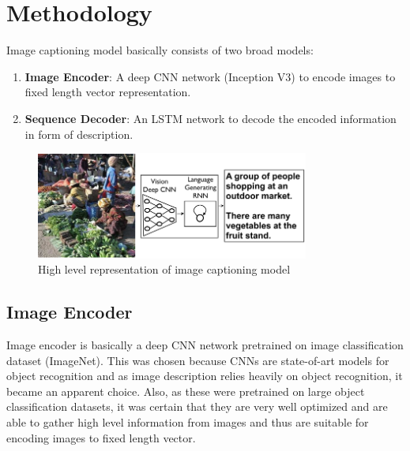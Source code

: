 \documentclass[11pt]{article}
\begin{document}
	\section{Methodology}
		Image captioning model basically consists of two broad models:
		\begin{enumerate}
		\item
			\textbf{Image Encoder}: A deep CNN network (Inception V3) to encode images to fixed length vector representation.
		\item
			\textbf{Sequence Decoder}: An LSTM network to decode the encoded information in form of description.
		\end{enumerate}
	
		\begin{figure}[ht!]
		\centering
		\includegraphics[width=0.8\textwidth]{model.png}
		\caption{High level representation of image captioning model}
		\centering
		\end{figure}
	
		\subsection{Image Encoder}
			Image encoder is basically a deep CNN network pretrained on image classification dataset (ImageNet). This was chosen because CNNs are state-of-art models for object recognition and as image description relies heavily on object recognition, it became an apparent choice. Also, as these were pretrained on large object classification datasets, it was certain that they are very well optimized and are able to gather high level information from images and thus are suitable for encoding images to fixed length vector.
\end{document}

